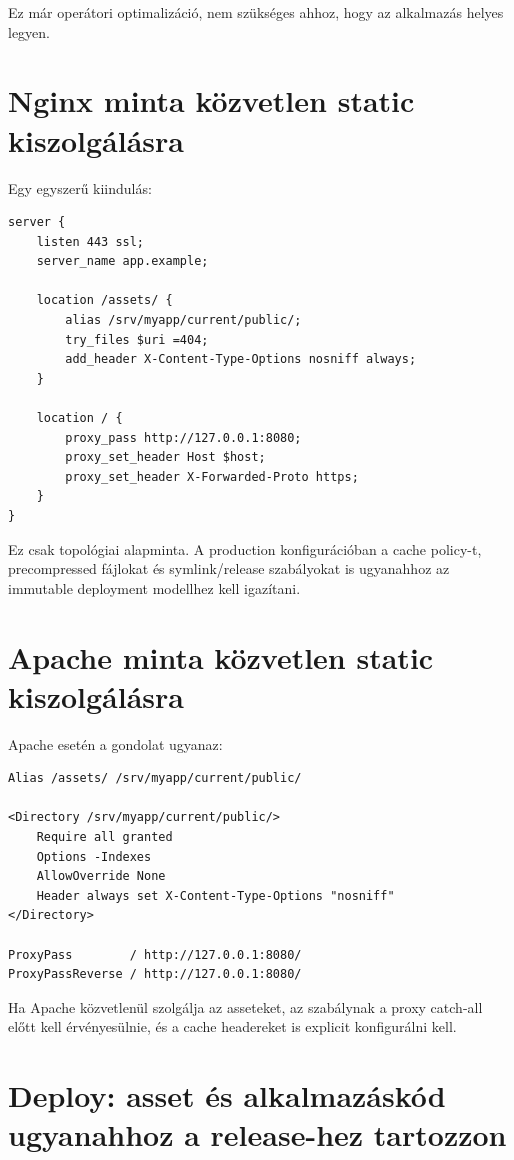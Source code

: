 Ez már operátori optimalizáció, nem szükséges ahhoz, hogy az alkalmazás helyes legyen.

\section{Nginx minta közvetlen static kiszolgálásra}

Egy egyszerű kiindulás:

\begin{lstlisting}
server {
    listen 443 ssl;
    server_name app.example;

    location /assets/ {
        alias /srv/myapp/current/public/;
        try_files $uri =404;
        add_header X-Content-Type-Options nosniff always;
    }

    location / {
        proxy_pass http://127.0.0.1:8080;
        proxy_set_header Host $host;
        proxy_set_header X-Forwarded-Proto https;
    }
}
\end{lstlisting}

Ez csak topológiai alapminta. A production konfigurációban a cache policy-t, precompressed fájlokat és symlink/release szabályokat is ugyanahhoz az immutable deployment modellhez kell igazítani.

\section{Apache minta közvetlen static kiszolgálásra}

Apache esetén a gondolat ugyanaz:

\begin{lstlisting}
Alias /assets/ /srv/myapp/current/public/

<Directory /srv/myapp/current/public/>
    Require all granted
    Options -Indexes
    AllowOverride None
    Header always set X-Content-Type-Options "nosniff"
</Directory>

ProxyPass        / http://127.0.0.1:8080/
ProxyPassReverse / http://127.0.0.1:8080/
\end{lstlisting}

Ha Apache közvetlenül szolgálja az asseteket, az  szabálynak a proxy catch-all előtt kell érvényesülnie, és a cache headereket is explicit konfigurálni kell.

\section{Deploy: asset és alkalmazáskód ugyanahhoz a release-hez tartozzon}

